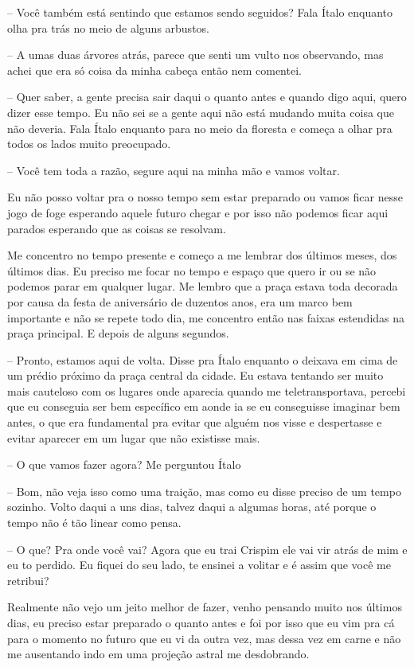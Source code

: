 -- Você também está sentindo que estamos sendo seguidos? Fala Ítalo enquanto olha pra trás no meio de alguns arbustos.

-- A umas duas árvores atrás, parece que senti um vulto nos observando, mas achei que era só coisa da minha cabeça então nem comentei.

-- Quer saber, a gente precisa sair daqui o quanto antes e quando digo aqui, quero dizer esse tempo. Eu não sei se a gente aqui não está mudando muita coisa que não deveria. Fala Ítalo enquanto para no meio da floresta e começa a olhar pra todos os lados muito preocupado.

-- Você tem toda a razão, segure aqui na minha mão e vamos voltar.

Eu não posso voltar pra o nosso tempo sem estar preparado ou vamos ficar nesse jogo de foge esperando aquele futuro chegar e por isso não podemos ficar aqui parados esperando que as coisas se resolvam.

Me concentro no tempo presente e começo a me lembrar dos últimos meses, dos últimos dias. Eu preciso me focar no tempo e espaço que quero ir ou se não podemos parar em qualquer lugar. Me lembro que a praça estava toda decorada por causa da festa de aniversário de duzentos anos, era um marco bem importante e não se repete todo dia, me concentro então nas faixas estendidas na praça principal. E depois de alguns segundos.

-- Pronto, estamos aqui de volta. Disse pra Ítalo enquanto o deixava em cima de um prédio próximo da praça central da cidade. Eu estava tentando ser muito mais cauteloso com os lugares onde aparecia quando me teletransportava, percebi que eu conseguia ser bem específico em aonde ia se eu conseguisse imaginar bem antes, o que era fundamental pra evitar que alguém nos visse e despertasse e evitar aparecer em um lugar que não existisse mais.

-- O que vamos fazer agora? Me perguntou Ítalo

-- Bom, não veja isso como uma traição, mas como eu disse preciso de um tempo sozinho. Volto daqui a uns dias, talvez daqui a algumas horas, até porque o tempo não é tão linear como pensa.

-- O que? Pra onde você vai? Agora que eu trai Crispim ele vai vir atrás de mim e eu to perdido. Eu fiquei do seu lado, te ensinei a volitar e é assim que você me retribui?

Realmente não vejo um jeito melhor de fazer, venho pensando muito nos últimos dias, eu preciso estar preparado o quanto antes e foi por isso que eu vim pra cá para o momento no futuro que eu vi da outra vez, mas dessa vez em carne e não me ausentando indo em uma projeção astral me desdobrando.

